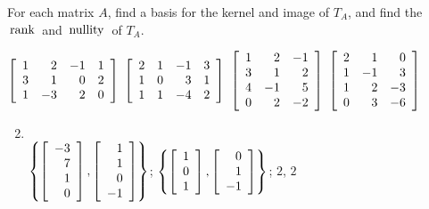\begin{multicols}{2}
\begin{ex}
For each matrix $A$, find a basis for the kernel and image of $T_{A}$, and find the $\thinspace\operatorname{rank\medspace}$ and $\thinspace\operatorname{nullity\medspace}$ of $T_{A}$.
\begin{exenumerate}
\exitem $\left[ \begin{array}{rrrr}
	1 & 2 & -1 & 1 \\
	3 & 1 & 0 & 2 \\
	1 & -3 & 2 & 0
\end{array} \right]$
\exitem $\left[ \begin{array}{rrrr}
2 & 1 & -1 & 3 \\
1 & 0 & 3 & 1 \\
1 & 1 & -4 & 2
\end{array} \right]$
\exitem $\left[ \begin{array}{rrr}
1 & 2 & -1 \\
3 & 1 & 2 \\
4 & -1 & 5 \\
0 & 2 & -2
\end{array} \right]$
\exitem $\left[ \begin{array}{rrr}
2 & 1 & 0 \\
1 & -1 & 3 \\
1 & 2 & -3 \\
0 & 3 & -6
\end{array} \right]$
\end{exenumerate}
\begin{sol}
\begin{enumerate}[label={\alph*.}]
\setcounter{enumi}{1}
\item \hspace{1em} \\
\hspace*{-2em}$\left\lbrace \left[ \begin{array}{r}
-3 \\
7 \\
1 \\
0
\end{array} \right], \left[ \begin{array}{r}
1 \\
1 \\
0 \\
-1
\end{array} \right] \right\rbrace$; 
$\left\lbrace \left[ \begin{array}{r}
	1 \\
	0 \\
	1 
\end{array} \right], \left[ \begin{array}{r}
	0 \\
	1 \\
	-1
\end{array} \right] \right\rbrace$; $2$, $2$


\end{enumerate}
\end{sol}
\end{ex}
\end{multicols}
